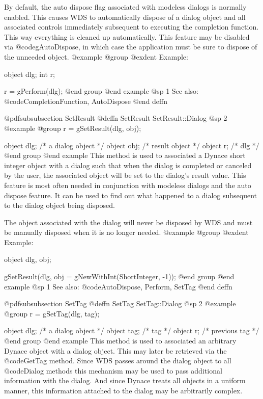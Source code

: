 By default, the auto dispose flag associated with modeless dialogs is
normally enabled.  This causes WDS to automatically dispose of a dialog
object and all associated controls immediately subsequent to executing
the completion function.  This way everything is cleaned up automatically.
This feature may be disabled via @code{gAutoDispose}, in which case the
application must be sure to dispose of the unneeded object.
@example
@group
@exdent Example:

object  dlg;
int     r;

r = gPerform(dlg);
@end group
@end example
@sp 1
See also:  @code{CompletionFunction, AutoDispose}
@end deffn













@pdfsubsubsection {SetResult}
@deffn {SetResult} SetResult::Dialog
@sp 2
@example
@group
r = gSetResult(dlg, obj);

object  dlg;    /*  a dialog object  */
object  obj;    /*  result object    */
object  r;      /*  dlg              */
@end group
@end example
This method is used to associated a Dynace short integer object with a
dialog such that when the dialog is completed or canceled by the user,
the associated object will be set to the dialog's result value.  This
feature is most often needed in conjunction with modeless dialogs and
the auto dispose feature.  It can be used to find out what happened to a
dialog subsequent to the dialog object being disposed.

The object associated with the dialog will never be disposed by WDS
and must be manually disposed when it is no longer needed.
@example
@group
@exdent Example:

object  dlg, obj;

gSetResult(dlg, obj = gNewWithInt(ShortInteger, -1));
@end group
@end example
@sp 1
See also:  @code{AutoDispose, Perform, SetTag}
@end deffn










@pdfsubsubsection {SetTag}
@deffn {SetTag} SetTag::Dialog
@sp 2
@example
@group
r = gSetTag(dlg, tag);

object  dlg;   /*  a dialog object   */
object  tag;    /*  tag               */
object  r;      /*  previous tag      */
@end group
@end example
This method is used to associated an arbitrary Dynace object with a
dialog object.  This may later be retrieved via the @code{GetTag} method.
Since WDS passes around the dialog object to all @code{Dialog} methods
this mechanism may be used to pass additional information with the
dialog.  And since Dynace treats all objects in a uniform manner, this
information attached to the dialog may be arbitrarily complex.

